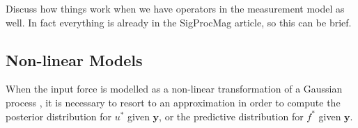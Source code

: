 \documentclass[journal]{IEEEtran}
\newcommand{\simo}[1]{{\color{red}#1}}
\begin{document}
\simo{Discuss how things work when we have operators in the measurement model as well. In fact everything is already in the SigProcMag article, so this can be brief.}



%
%
%

%
%
\subsection{Non-linear Models}

When the input force is modelled as a non-linear transformation of a Gaussian process \cite{Lawrence:gpsim2007a,
Gao:latent08, Titsias:BMC:2012}, it is necessary to resort to an approximation in order to compute the posterior
distribution for $u^*$ given $\mathbf{y}$, or the predictive distribution for $f^*$ given $\mathbf{y}$.
\end{document}
